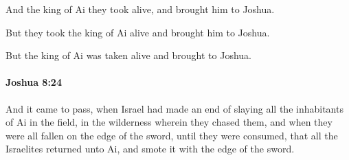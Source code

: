 			\begin{versebox}
					\item[BHS] 
					\item[ASV] And the king of Ai they took alive, and brought him to Joshua.
					\item[NIV] But they took the king of Ai alive and brought him to Joshua.
					\item[NRSV] But the king of Ai was taken alive and brought to Joshua.
			\end{versebox}

		\paragraph{Joshua 8:24} %
			\label{JOSHUA-8-24}

			And it came to pass, when Israel had made an end of slaying all the inhabitants of Ai in the field, in the wilderness wherein they chased them, and when they were all fallen on the edge of the sword, until they were consumed, that all the Israelites returned unto Ai, and smote it with the edge of the sword.

